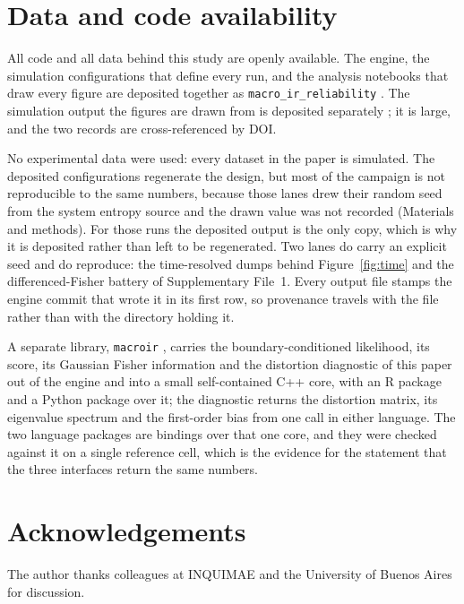 \section*{Data and code availability}
All code and all data behind this study are openly available. The engine, the simulation
configurations that define every run, and the analysis notebooks that draw every figure are
deposited together as \texttt{macro\_ir\_reliability} \citep{moffatt2026code}. The simulation
output the figures are drawn from is deposited separately \citep{moffatt2026data}; it is large,
and the two records are cross-referenced by DOI.

No experimental data were used: every dataset in the paper is simulated. The deposited
configurations regenerate the design, but most of the campaign is not reproducible to the same
numbers, because those lanes drew their random seed from the system entropy source and the drawn
value was not recorded (Materials and methods). For those runs the deposited output is the only
copy, which is why it is deposited rather than left to be regenerated. Two lanes do carry an
explicit seed and do reproduce: the time-resolved dumps behind Figure~\ref{fig:time} and the
differenced-Fisher battery of Supplementary File~1. Every output file stamps the engine commit
that wrote it in its first row, so provenance travels with the file rather than with the
directory holding it.

A separate library, \texttt{macroir} \citep{moffatt2026macroirlib}, carries the
boundary-conditioned likelihood, its score, its Gaussian Fisher information and the distortion
diagnostic of this paper out of the engine and into a small self-contained C++ core, with an R
package and a Python package over it; the diagnostic returns the distortion matrix, its
eigenvalue spectrum and the first-order bias from one call in either language. The two language
packages are bindings over that one core, and they were checked against it on a single reference
cell, which is the evidence for the statement that the three interfaces return the same numbers.

\section*{Acknowledgements}

The author thanks colleagues at INQUIMAE and the University of Buenos Aires for discussion. %

